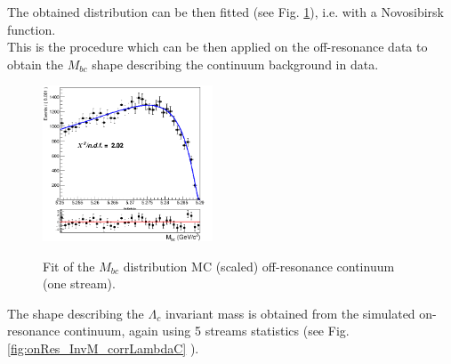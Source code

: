  \noindent  The obtained distribution can be then fitted (see Fig. \ref{fig:charged_corrLambdaC_Mbc_continuumMC_fit}), i.e. with a Novosibirsk function. \\
This is the procedure which can be then applied on the off-resonance data to obtain the $M_{bc}$ shape describing the continuum background in data.
\begin{figure}[h!]
{\includegraphics[width=0.45\textwidth]{04-chargedCorrBtoLambda/figs/stream5_rescaledMbc_40binsHist.png}}
\caption{Fit of the $M_{bc}$ distribution   MC (scaled) off-resonance continuum (one stream).}
\label{fig:charged_corrLambdaC_Mbc_continuumMC_fit}
\end{figure}


\newpage
The shape describing the $\Lambda_c$ invariant mass is obtained from the simulated on-resonance continuum, again using 5 streams statistics (see Fig. \ref{fig:onRes_InvM_corrLambdaC} ).

